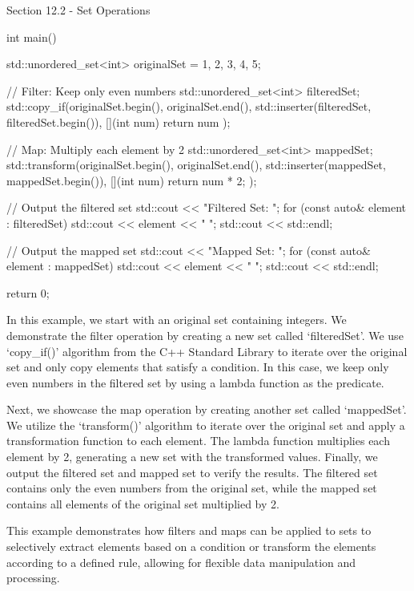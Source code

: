 \begin{notes}{Section 12.2 - Set Operations}
\begin{highlight}
\begin{code}[C++]
        int main() {
            std::unordered_set<int> originalSet = {1, 2, 3, 4, 5};
        
            // Filter: Keep only even numbers
            std::unordered_set<int> filteredSet;
            std::copy_if(originalSet.begin(), originalSet.end(), 
            std::inserter(filteredSet, filteredSet.begin()), [](int num) {
                return num %
            });
        
            // Map: Multiply each element by 2
            std::unordered_set<int> mappedSet;
            std::transform(originalSet.begin(), originalSet.end(), 
            std::inserter(mappedSet, mappedSet.begin()), [](int num) {
                return num * 2;
            });
        
            // Output the filtered set
            std::cout << "Filtered Set: ";
            for (const auto& element : filteredSet) {
                std::cout << element << " ";
            }
            std::cout << std::endl;
        
            // Output the mapped set
            std::cout << "Mapped Set: ";
            for (const auto& element : mappedSet) {
                std::cout << element << " ";
            }
            std::cout << std::endl;
        
            return 0;
        }
        \end{code}
        In this example, we start with an original set containing integers. We demonstrate the filter operation by creating a new set called `filteredSet'. We use `copy\_if()' algorithm from the C++ Standard Library to iterate over the original set and only copy elements that satisfy a condition. In this case, we keep only even numbers in the filtered set by using a 
        lambda function as the predicate.
        
        Next, we showcase the map operation by creating another set called `mappedSet'. We utilize the `transform()' algorithm to iterate over the original set and apply a transformation function to each element. The lambda function multiplies each element by 2, generating a new set with the transformed values. Finally, we output the filtered set and mapped set to verify 
        the results. The filtered set contains only the even numbers from the original set, while the mapped set contains all elements of the original set multiplied by 2.
        
        This example demonstrates how filters and maps can be applied to sets to selectively extract elements based on a condition or transform the elements according to a defined rule, allowing for flexible data manipulation and processing.
    \end{highlight}
\end{notes}

